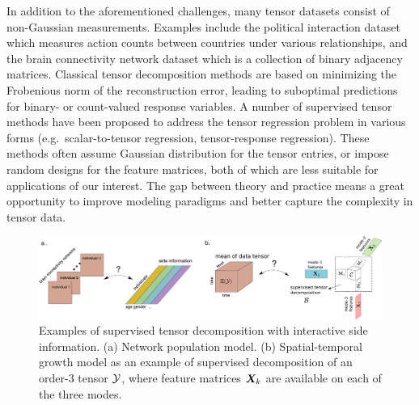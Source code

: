 \documentclass[10pt]{article}
\theoremstyle{definition}
\theoremstyle{definition}
\theoremstyle{definition}
\begin{document}
\begin{enumerate}
In addition to the aforementioned challenges, many tensor datasets consist of non-Gaussian measurements. Examples include the political interaction dataset \cite{hu2015scalable} which measures action counts between countries under various relationships, and the brain connectivity network dataset \cite{zhang2018mapping} which is a collection of binary adjacency matrices. Classical tensor decomposition methods are based on minimizing the Frobenious norm of the reconstruction error, leading to suboptimal predictions for binary- or count-valued response variables. A number of supervised tensor methods have been proposed \cite{narita2012tensor} to address the tensor regression problem in various forms (e.g.\ scalar-to-tensor regression, tensor-response regression). These methods often assume Gaussian distribution for the tensor entries, or impose random designs for the feature matrices, both of which are less suitable for applications of our interest. The gap between theory and practice means a great opportunity to improve modeling paradigms and better capture the complexity in tensor data. 

\begin{figure}[ht]
\begin{center}
\includegraphics[width=16cm]{demo.pdf}
\end{center}
\caption{Examples of supervised tensor decomposition with interactive side information. (a) Network population model. (b) Spatial-temporal growth model as an example of supervised decomposition of an order-3 tensor $\mathcal{Y}$, where feature matrices $\bm X_k$ are available on each of the three modes.}\label{fig:intro1}
\end{figure}


\end{enumerate}
\end{document}
